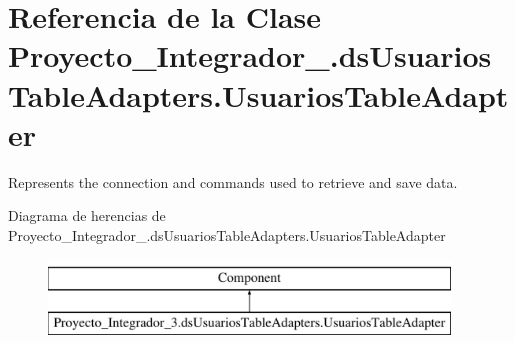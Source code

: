 \hypertarget{class_proyecto___integrador__3_1_1ds_usuarios_table_adapters_1_1_usuarios_table_adapter}{\section{Referencia de la Clase Proyecto\-\_\-\-Integrador\-\_.\-ds\-Usuarios\-Table\-Adapters.\-Usuarios\-Table\-Adapter}
\label{class_proyecto___integrador__3_1_1ds_usuarios_table_adapters_1_1_usuarios_table_adapter}
}


Represents the connection and commands used to retrieve and save data.  


Diagrama de herencias de Proyecto\-\_\-\-Integrador\-\_.\-ds\-Usuarios\-Table\-Adapters.\-Usuarios\-Table\-Adapter\begin{figure}[H]
\begin{center}
\leavevmode
\includegraphics[height=2.000000cm]{de/d93/class_proyecto___integrador__3_1_1ds_usuarios_table_adapters_1_1_usuarios_table_adapter}
\end{center}
\end{figure}
